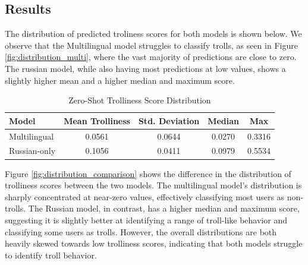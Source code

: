 \documentclass[twoside]{ctuthesis}
\theoremstyle{plain}
\theoremstyle{definition}
\theoremstyle{note}
\begin{document}
\subsection{Results}
The distribution of predicted troliness scores for both models is shown below. We observe that the Multilingual model struggles to classify trolls, as seen in Figure \ref{fig:distribution_multi}, where the vast majority of predictions are close to zero. The russian model, while also having most predictions at low values, shows a slightly higher mean and a higher median and maximum score.

\begin{table}[h]
  \centering
  \begin{tabular}{|l|c|c|c|c|}
  \hline
 Model      & Mean Trolliness & Std. Deviation & Median & Max  \\
  \hline
 Multilingual   & 0.0561     & 0.0644     & 0.0270 & 0.3316 \\
 Russian-only   & 0.1056     & 0.0411     & 0.0979 & 0.5534 \\
  \hline
  \end{tabular}
  \caption{Zero-Shot Trolliness Score Distribution}
  \label{tab:zero_shot_scores}
\end{table}

Figure \ref{fig:distribution_comparison} shows the difference in the distribution of trolliness scores between the two models. The multilingual model's distribution is sharply concentrated at near-zero values, effectively classifying most users as non-trolls. The Russian model, in contrast, has a higher median and maximum score, suggesting it is slightly better at identifying a range of troll-like behavior and classifying some users as trolls. However, the overall distributions are both heavily skewed towards low trolliness scores, indicating that both models struggle to identify troll behavior.\par
\end{document}
